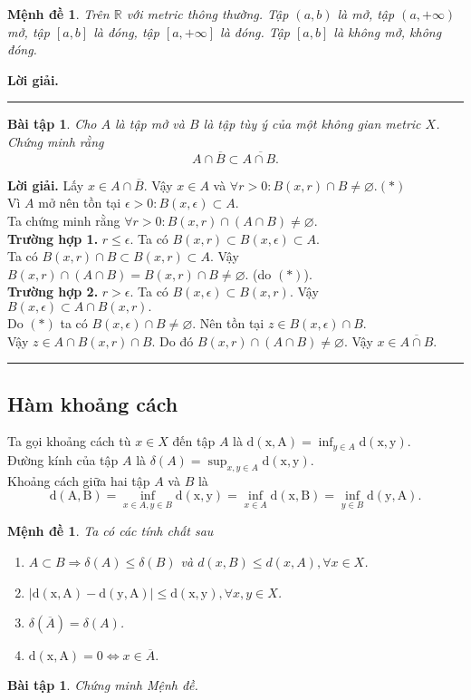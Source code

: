 \documentclass[a4paper, 12pt]{article}
\makeatletter
\newtheorem{exercise}[theorem]{Bài tập}
\newtheorem{proposition}[theorem]{Mệnh đề}
\newenvironment{proof}[1][Proof]{\textbf{#1.} }{\hfill\rule{0.5em}{0.5em}}
{\catcode`\@=11\global\let\AddToReset=\@addtoreset}
\newcommand{\xd}{\\[7pt]}
\makeatother
\begin{document}
\begin{proposition}
Trên $\mathbb{R}$ với metric thông thường. Tập $(a,b)$ là mở, tập $(a, +\infty)$ mở, tập $[a,b]$ là đóng, tập $[a, +\infty]$ là đóng. Tập $[a,b]$ là không mở, không đóng.
\end{proposition}
\begin{proof}[Lời giải]

\end{proof}
\begin{exercise}
Cho $A$ là tập mở và $B$ là tập tùy ý của một không gian metric $X$. Chứng minh rằng $$A \cap \overline{B} \subset \overline{A \cap B.}$$
\end{exercise}
\begin{proof}[Lời giải]
Lấy $x \in A \cap \overline{B}$. Vậy $x \in A$ và $\forall r>0: B(x,r) \cap B \neq \varnothing. (*)$\xd
Vì $A$ mở nên tồn tại $\epsilon>0: B(x,\epsilon) \subset A.$\xd
Ta chứng minh rằng $\forall r>0: B(x,r) \cap (A \cap B) \neq \varnothing.$\xd
\textbf{Trường hợp 1.} $r\le \epsilon$. Ta có $B(x,r) \subset B(x,\epsilon) \subset A$.\xd
Ta có $B(x,r) \cap B \subset B(x,r) \subset A$. Vậy $B(x,r) \cap (A \cap B) = B(x,r) \cap B \neq \varnothing$. (do $(*)$).\xd
\textbf{Trường hợp 2.} $r>\epsilon$. Ta có $B(x,\epsilon) \subset B(x,r)$. Vậy $B(x,\epsilon) \subset A \cap B(x,r).$\xd
Do $(*)$ ta có $B(x,\epsilon) \cap B \neq \varnothing$. Nên tồn tại $z \in B(x,\epsilon) \cap B$.\xd
Vậy $z \in A \cap B(x,r) \cap B$. Do đó $B(x,r) \cap (A \cap B) \neq \varnothing$.
Vậy $x \in \overline{A \cap B}.$
\end{proof}
\subsection{Hàm khoảng cách}
Ta gọi khoảng cách tù $x \in X$ đến tập $A$ là $\mathrm{d(x, A)}=\inf_{y\in A}\mathrm{d(x,y)}$.\xd
Đường kính của tập $A$ là $\delta(A)=\sup_{x,y \in A}\mathrm{d(x,y)}.$\xd
Khoảng cách giữa hai tập $A$ và $B$ là
$$\mathrm{d(A,B)}=\inf_{x\in A, y \in B}\mathrm{d(x,y)}=\inf_{x\in A}\mathrm{d(x,B)}=\inf_{y\in B}\mathrm{d(y,A)}.$$
\begin{proposition}
Ta có các tính chất sau
\begin{enumerate}
    \item $A \subset B \Rightarrow \delta(A) \le \delta(B)$ và $d(x,B) \le d(x,A), \forall x \in X$.
    \item $|\mathrm{d(x,A)}-\mathrm{d(y,A)}| \le \mathrm{d(x,y)}, \forall x, y \in X$.
    \item $\delta(\overline{A})=\delta(A)$.
    \item $\mathrm{d(x,A)}=0 \Leftrightarrow x \in \overline{A}.$
\end{enumerate}
\end{proposition}
\begin{exercise}
Chứng minh Mệnh đề.
\end{exercise}
\end{document}
